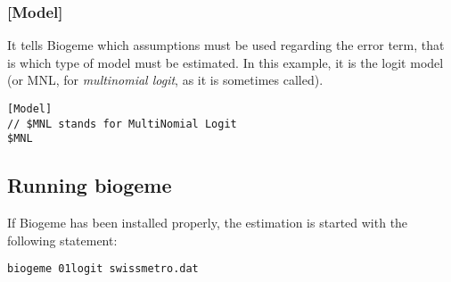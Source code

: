 \documentclass[12pt]{memoir}
\begin{document}
\subsubsection{[Model]}
It tells Biogeme which assumptions must
be used regarding the error term, that is which type of model must be
estimated. In this example, it is the logit model (or MNL, for \emph{multinomial logit}, as it is sometimes called).

{\footnotesize
\begin{verbatim}
[Model]
// $MNL stands for MultiNomial Logit 
$MNL
\end{verbatim}
}

\subsection{Running biogeme}

If Biogeme has been installed properly, the estimation is started with the following statement:
{\footnotesize
\begin{verbatim}
biogeme 01logit swissmetro.dat
\end{verbatim}
}
\end{document}
